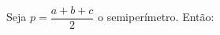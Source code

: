 \documentclass[preview]{standalone}
\begin{document}
\begin{center}
Seja $p = \dfrac{a + b + c}{2}$ o semiperímetro. Então:
\end{center}
\end{document}
